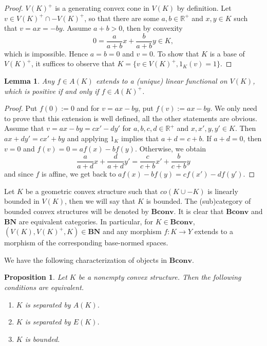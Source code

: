 \documentclass[12pt]{article}
\newtheorem{lemma}{Lemma}
\newtheorem{prop}{Proposition}
\theoremstyle{remark}
\newcommand{\<}{\langle}
\newcommand{\ct}[1]{\mathbf{#1}}
\begin{document}
\begin{proof} $V(K)^+$ is a generating convex cone in $V(K)$ by definition. Let $v\in V(K)^+\cap -V(K)^+$, so that there are some $a,b\in \mathbb R^+$ and $x,y\in K$ such that $v=ax=-by$. Assume $a+b>0$, then by convexity 
\[
0=\frac a{a+b}x+\frac b{a+b}y\in K,
\]
 which is impossible. Hence $a=b=0$ and $v=0$. To show that $K$ is a base of $V(K)^+$, it suffices to observe that $K=\{v\in V(K)^+, 1_K(v)=1\}$.


\end{proof}



\begin{lemma}\label{lemma:extension} Any $f\in A(K)$ extends to a (unique) linear functional on $V(K)$, which is positive if and only if $f\in A(K)^+$.

\end{lemma}

\begin{proof} Put $f(0):=0$ and for $v=ax-by$, put $f(v):=ax-by$. We only need to prove that this extension is well defined, all the other  statements are obvious. Assume that $v=ax-by=cx'-dy'$ for $a,b,c,d\in \mathbb R^+$ and $x,x',y,y'\in K$. Then $ax+dy'=cx'+by$ and applying $1_K$ implies that $a+d=c+b$.
 If $a+d=0$, then $v=0$ and $f(v)=0=af(x)-bf(y)$. Otherwise, we obtain 
 \[
\frac a{a+d}x+ \frac d{a+d}y'=\frac c{c+b} x'+\frac b{c+b} y
 \]
and since $f$ is affine, we get back to $af(x)-bf(y)=cf(x')-df(y')$. 
\end{proof}






Let $K$ be a geometric convex structure such that $co(K\cup -K)$ is linearly bounded in $V(K)$, then we will say that $K$ is bounded.
 The (sub)category of  bounded convex structures will be denoted by $\ct{Bconv}$. It is clear that $\ct{Bconv}$ and $\ct{BN}$ are equivalent categories. In particular,
for $K\in \ct{Bconv}$, $(V(K),V(K)^+,K)\in \ct{BN}$ and any morphism $f:K\to Y$ extends to a morphism of the corresponding base-normed spaces. 


We have the following characterization of objects in $\ct{Bconv}$.
\begin{prop}\label{prop:bounded} Let $K$ be a nonempty convex structure. Then the following conditions  are equivalent.
\begin{enumerate}
\item[(i)] $K$ is separated by $A(K)$.
\item[(ii)] $K$ is separated by $E(K)$.
\item[(iii)] $K$ is bounded.
\end{enumerate}

\end{prop}
\end{document}
